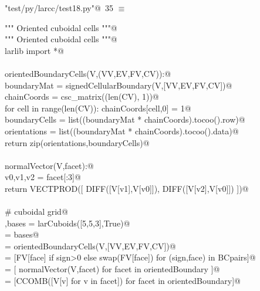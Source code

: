 \documentclass[11pt,oneside]{article}    %
\begin{document}
\begin{flushleft} \small \label{scrap57}
\protect{}\verb@"test/py/larcc/test18.py"@\nobreak\ {\footnotesize 35 }$\equiv$
\vspace{-1ex}
\begin{list}{}{} \item
\mbox{}\verb@""" Oriented cuboidal cells """@\\
\mbox{}\verb@""" Oriented cuboidal cells """@\\
\mbox{}\verb@from larlib import *@\\
\mbox{}\verb@@\\
\mbox{}\verb@def orientedBoundaryCells(V,(VV,EV,FV,CV)):@\\
\mbox{}\verb@    boundaryMat = signedCellularBoundary(V,[VV,EV,FV,CV])@\\
\mbox{}\verb@    chainCoords = csc_matrix((len(CV), 1))@\\
\mbox{}\verb@    for cell in range(len(CV)): chainCoords[cell,0] = 1@\\
\mbox{}\verb@    boundaryCells = list((boundaryMat * chainCoords).tocoo().row)@\\
\mbox{}\verb@    orientations = list((boundaryMat * chainCoords).tocoo().data)@\\
\mbox{}\verb@    return zip(orientations,boundaryCells)@\\
\mbox{}\verb@@\\
\mbox{}\verb@def normalVector(V,facet):@\\
\mbox{}\verb@    v0,v1,v2 = facet[:3]@\\
\mbox{}\verb@    return VECTPROD([ DIFF([V[v1],V[v0]]), DIFF([V[v2],V[v0]]) ])@\\
\mbox{}\verb@@\\
\mbox{}\verb@# cuboidal grid@\\
\mbox{}\verb@V,bases = larCuboids([5,5,3],True)@\\
\mbox{}\verb@[VV,EV,FV,CV] = bases@\\
\mbox{}\verb@BCpairs = orientedBoundaryCells(V,[VV,EV,FV,CV])@\\
\mbox{}\verb@orientedBoundary = [FV[face] if sign>0 else swap(FV[face]) for (sign,face) in BCpairs]@\\
\mbox{}\verb@normals = [ normalVector(V,facet)  for facet in orientedBoundary ]@\\
\mbox{}\verb@facetCentroids = [CCOMB([V[v] for v in facet]) for facet in orientedBoundary]@\\

\end{list}
\end{flushleft}
\end{document}
